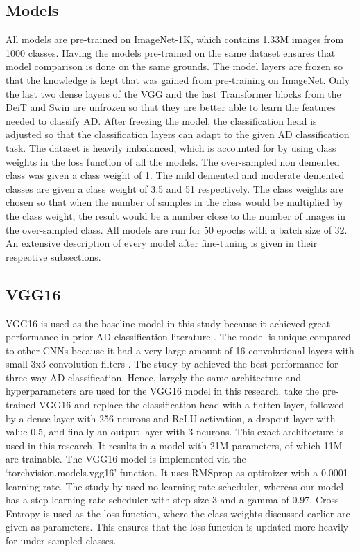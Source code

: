 \documentclass[11pt, a4paper]{article}
\begin{document}
\subsection{Models} \label{subs:models} 
All models are pre-trained on ImageNet-1K, which contains 1.33M images from 1000 classes. Having the models pre-trained on the same dataset ensures that model comparison is done on the same grounds. The model layers are frozen so that the knowledge is kept that was gained from pre-training on ImageNet. Only the last two dense layers of the VGG and the last Transformer blocks from the DeiT and Swin are unfrozen so that they are better able to learn the features needed to classify AD. After freezing the model, the classification head is adjusted so that the classification layers can adapt to the given AD classification task. The dataset is heavily imbalanced, which is accounted for by using class weights in the loss function of all the models. The over-sampled non demented class was given a class weight of 1. The mild demented and moderate demented classes are given a class weight of 3.5 and 51 respectively. The class weights are chosen so that when the number of samples in the class would be multiplied by the class weight, the result would be a number close to the number of images in the over-sampled class. All models are run for 50 epochs with a batch size of 32. An extensive description of every model after fine-tuning is given in their respective subsections.


\subsection{VGG16} \label{subs:VGG} 
VGG16 is used as the baseline model in this study because it achieved great performance in prior AD classification literature \citep{Billones2017DemNet:Impairment,Hon2017TowardsLearning,Jain2019ConvolutionalImages}. The model is unique compared to other CNNs because it had a very large amount of 16 convolutional layers with small 3x3 convolution filters \citep{Simonyan2014VeryRecognition}. The study by \cite{Jain2019ConvolutionalImages} achieved the best performance for three-way AD classification. Hence, largely the same architecture and hyperparameters are used for the VGG16 model in this research. \cite{Jain2019ConvolutionalImages} take the pre-trained VGG16 and replace the classification head with a flatten layer, followed by a dense layer with 256 neurons and ReLU activation, a dropout layer with value 0.5, and finally an output layer with 3 neurons. This exact architecture is used in this research. It results in a model with 21M parameters, of which 11M are trainable. The VGG16 model is implemented via the ‘torchvision.models.vgg16’ function. It uses RMSprop as optimizer with a 0.0001 learning rate. The study by \cite{Jain2019ConvolutionalImages} used no learning rate scheduler, whereas our model has a step learning rate scheduler with step size 3 and a gamma of 0.97. Cross-Entropy is used as the loss function, where the class weights discussed earlier are given as parameters. This ensures that the loss function is updated more heavily for under-sampled classes. 
\end{document}
